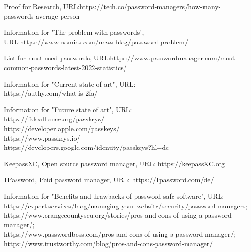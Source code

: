 \documentclass[conference]{IEEEtran}
\begin{document}
\begin{thebibliography}{00}
 Proof for Research, URL:https://tech.co/password-managers/how-many-passwords-average-person

 Information for "The problem with passwords", URL:https://www.nomios.com/news-blog/password-problem/ 

 List for most used passwords, URL:https://www.passwordmanager.com/most-common-passwords-latest-2022-statistics/

 Information for "Current state of art", URL:\\ https://authy.com/what-is-2fa/

 Information for "Future state of art", URL:\\https://fidoalliance.org/passkeys/\\ https://developer.apple.com/passkeys/\\ https://www.passkeys.io/\\ https://developers.google.com/identity/passkeys?hl=de

 KeepassXC, Open source password manager, URL: https://keepassXC.org

 1Password, Paid password manager, URL: https://1password.com/de/

 Information for "Benefits and drawbacks of password safe software", URL: \\
https://expert.services/blog/managing-your-website/security/password-managers;\\ https://www.orangecountyscu.org/stories/pros-and-cons-of-using-a-password-manager/; \\ https://www.passwordboss.com/pros-and-cons-of-using-a-password-manager/; \\https://www.trustworthy.com/blog/pros-and-cons-password-manager/

\end{thebibliography}
\end{document}
